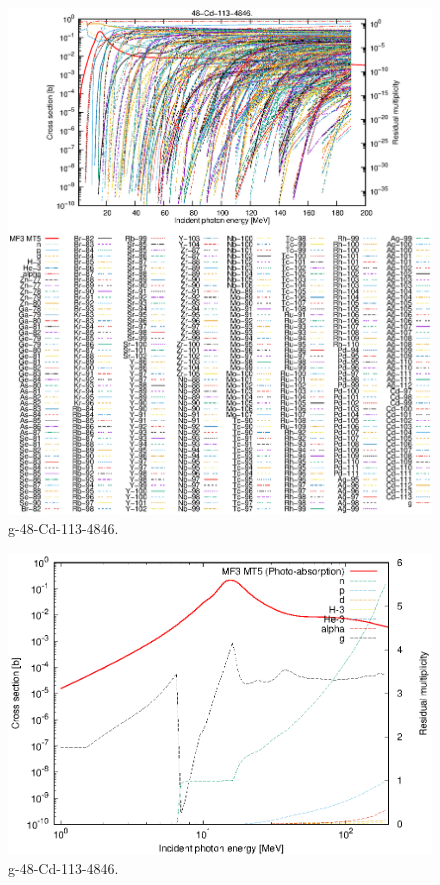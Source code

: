 \begin{figure}
 \includegraphics[width=\linewidth]{eps/g_48-Cd-113_4846.eps}
  \caption{g-48-Cd-113-4846.}
\end{figure}
\newpage \clearpage

\begin{figure}
 \includegraphics[width=\linewidth]{eps-log/g_48-Cd-113_4846.eps}
 \caption{g-48-Cd-113-4846.}
\end{figure}
\newpage \clearpage

